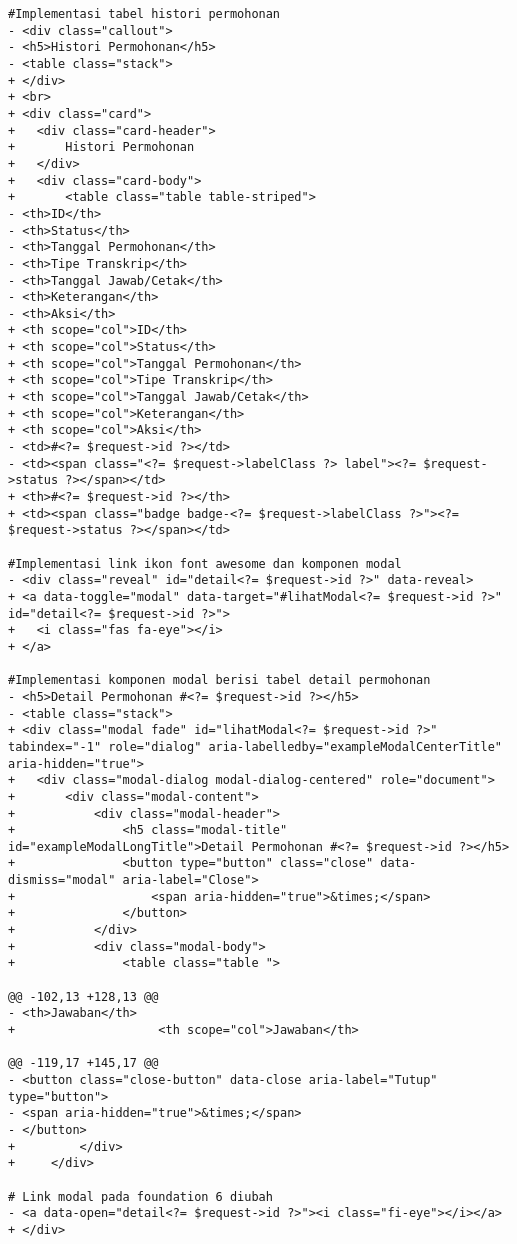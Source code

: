 \begin{lstlisting}
#Implementasi tabel histori permohonan
- <div class="callout">
- <h5>Histori Permohonan</h5>
- <table class="stack">
+ </div>
+ <br>
+ <div class="card">
+ 	<div class="card-header">
+ 		Histori Permohonan
+ 	</div>
+ 	<div class="card-body">
+ 		<table class="table table-striped">
- <th>ID</th>
- <th>Status</th>
- <th>Tanggal Permohonan</th>
- <th>Tipe Transkrip</th>
- <th>Tanggal Jawab/Cetak</th>
- <th>Keterangan</th>
- <th>Aksi</th>
+ <th scope="col">ID</th>
+ <th scope="col">Status</th>
+ <th scope="col">Tanggal Permohonan</th>
+ <th scope="col">Tipe Transkrip</th>
+ <th scope="col">Tanggal Jawab/Cetak</th>
+ <th scope="col">Keterangan</th>
+ <th scope="col">Aksi</th>
- <td>#<?= $request->id ?></td>
- <td><span class="<?= $request->labelClass ?> label"><?= $request->status ?></span></td>
+ <th>#<?= $request->id ?></th>
+ <td><span class="badge badge-<?= $request->labelClass ?>"><?= $request->status ?></span></td>

#Implementasi link ikon font awesome dan komponen modal
- <div class="reveal" id="detail<?= $request->id ?>" data-reveal>
+ <a data-toggle="modal" data-target="#lihatModal<?= $request->id ?>" id="detail<?= $request->id ?>">
+ 	<i class="fas fa-eye"></i>
+ </a>

#Implementasi komponen modal berisi tabel detail permohonan
- <h5>Detail Permohonan #<?= $request->id ?></h5>
- <table class="stack">
+ <div class="modal fade" id="lihatModal<?= $request->id ?>" tabindex="-1" role="dialog" aria-labelledby="exampleModalCenterTitle" aria-hidden="true">
+ 	<div class="modal-dialog modal-dialog-centered" role="document">
+ 	    <div class="modal-content">
+ 	        <div class="modal-header">
+ 	            <h5 class="modal-title" id="exampleModalLongTitle">Detail Permohonan #<?= $request->id ?></h5>
+ 	            <button type="button" class="close" data-dismiss="modal" aria-label="Close">
+ 	                <span aria-hidden="true">&times;</span>
+ 	            </button>
+ 	        </div>
+ 	        <div class="modal-body">
+ 	            <table class="table ">

@@ -102,13 +128,13 @@
- <th>Jawaban</th>
+                    <th scope="col">Jawaban</th>

@@ -119,17 +145,17 @@
- <button class="close-button" data-close aria-label="Tutup" type="button">
- <span aria-hidden="true">&times;</span>
- </button>
+         </div>
+     </div>

# Link modal pada foundation 6 diubah
- <a data-open="detail<?= $request->id ?>"><i class="fi-eye"></i></a>
+ </div> 
\end{lstlisting}
